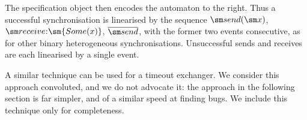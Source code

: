 \begin{window}[0,r,{
\begin{minipage}{48.5mm}
\begin{tikzpicture}[>= angle 60]
\draw (0,0) node[draw] (zero) {$\sm{Zero}$};
\draw[<-] (zero) -- ++ (-1.5,0);
\loopRight(zero){$
  \begin{align} 
  \sm{sendFail}, \\ \overline{\send}, \\ \sm{receiveFail}
  \end{align}$}%
%
\draw (0,-2) node[draw] (one) {$\sm{One}(\sm{x})$};
\draw[->] (zero) .. controls ++(0.3,-1) .. node[right] {$\sm{send(x)}$} (one); 
\draw[->] (one) .. controls ++(-0.3,1) .. 
  node[left] {$\begin{align}\sm{receive}\::\\ \quad\sm{Some(x)}\end{align}$} (zero);
\end{tikzpicture}
\end{minipage}
},] 
The specification object then encodes the automaton to the right.
Thus a successful synchronisation is linearised by the sequence $\send(\sm x)$,
$\receive\::\sm{Some(x)}$, $\overline{\send}$, with the former two events
consecutive, as for other binary heterogeneous synchronisations.  Unsuccessful
sends and receives are each linearised by a single event.
\end{window}



A similar technique can be used for a timeout exchanger.  We consider this
approach convoluted, and we do not advocate it: the approach in the following
section is far simpler, and of a similar speed at finding bugs.  We include
this technique only for completeness.

